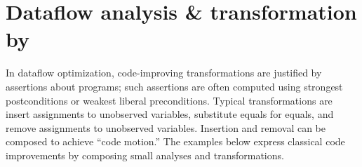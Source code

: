 \documentclass[blockstyle,preprint,natbib,nocopyrightspace]{sigplanconf}
\newcommand\seclabel[1]{\label{sec:#1}}
\begin{document}
\section{Dataflow analysis {\&} transformation by }

\seclabel{example:transforms}
\seclabel{example:xforms}

In dataflow optimization, code-improving transformations are justified
by assertions about programs;
such assertions are often computed using
strongest postconditions or weakest liberal preconditions.
Typical transformations are
insert assignments to unobserved variables,
substitute equals for equals, 
and
remove assignments to unobserved variables.
Insertion and removal can be composed to achieve 
``code motion.''
The examples below express classical code
improvements by composing small analyses and transformations.
\end{document}
